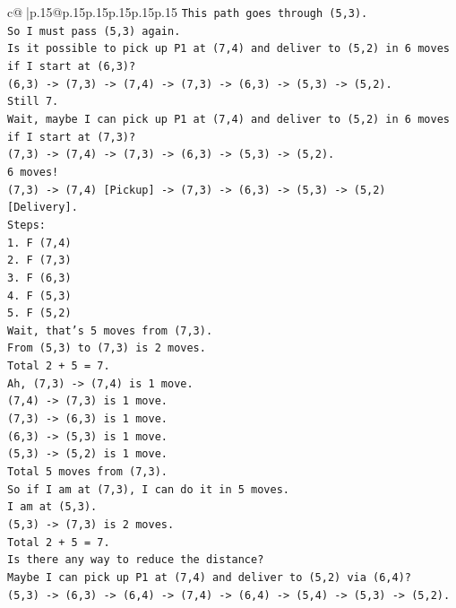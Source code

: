 \documentclass{article}
\begin{document}
{\begin{supertabular}{c@{$\;$}|p{.15\linewidth}@{}p{.15\linewidth}p{.15\linewidth}p{.15\linewidth}p{.15\linewidth}p{.15\linewidth}}
{{{\texttt{This path goes through (5,3).} \\
\texttt{So I must pass (5,3) again.} \\
\texttt{Is it possible to pick up P1 at (7,4) and deliver to (5,2) in 6 moves if I start at (6,3)?} \\
\texttt{(6,3) {-}> (7,3) {-}> (7,4) {-}> (7,3) {-}> (6,3) {-}> (5,3) {-}> (5,2).} \\
\texttt{Still 7.} \\
\texttt{Wait, maybe I can pick up P1 at (7,4) and deliver to (5,2) in 6 moves if I start at (7,3)?} \\
\texttt{(7,3) {-}> (7,4) {-}> (7,3) {-}> (6,3) {-}> (5,3) {-}> (5,2).} \\
\texttt{6 moves!} \\
\texttt{(7,3) {-}> (7,4) {[}Pickup{]} {-}> (7,3) {-}> (6,3) {-}> (5,3) {-}> (5,2) {[}Delivery{]}.} \\
\texttt{Steps:} \\
\texttt{1. F (7,4)} \\
\texttt{2. F (7,3)} \\
\texttt{3. F (6,3)} \\
\texttt{4. F (5,3)} \\
\texttt{5. F (5,2)} \\
\texttt{Wait, that's 5 moves from (7,3).} \\
\texttt{From (5,3) to (7,3) is 2 moves.} \\
\texttt{Total 2 + 5 = 7.} \\
\texttt{Ah, (7,3) {-}> (7,4) is 1 move.} \\
\texttt{(7,4) {-}> (7,3) is 1 move.} \\
\texttt{(7,3) {-}> (6,3) is 1 move.} \\
\texttt{(6,3) {-}> (5,3) is 1 move.} \\
\texttt{(5,3) {-}> (5,2) is 1 move.} \\
\texttt{Total 5 moves from (7,3).} \\
\texttt{So if I am at (7,3), I can do it in 5 moves.} \\
\texttt{I am at (5,3).} \\
\texttt{(5,3) {-}> (7,3) is 2 moves.} \\
\texttt{Total 2 + 5 = 7.} \\
\texttt{Is there any way to reduce the distance?} \\
\texttt{Maybe I can pick up P1 at (7,4) and deliver to (5,2) via (6,4)?} \\
\texttt{(5,3) {-}> (6,3) {-}> (6,4) {-}> (7,4) {-}> (6,4) {-}> (5,4) {-}> (5,3) {-}> (5,2).} \\
}}}
\end{supertabular}}
\end{document}
